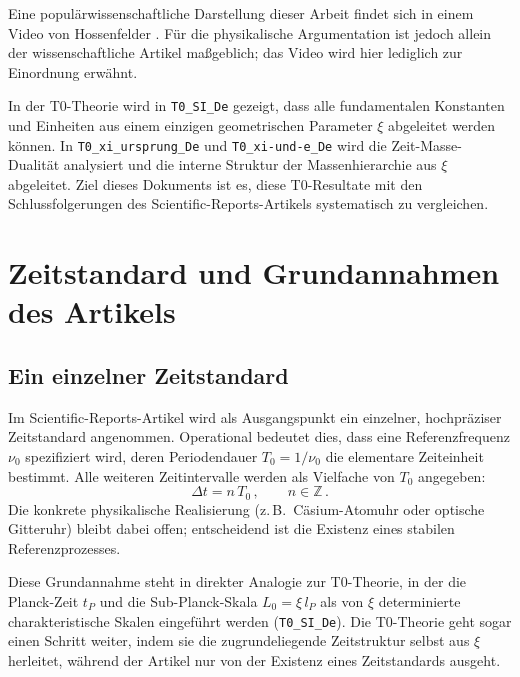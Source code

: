 Eine populärwissenschaftliche Darstellung dieser Arbeit findet sich in einem
Video von Hossenfelder \cite{hossenfelder_single_clock_video}. Für die
physikalische Argumentation ist jedoch allein der wissenschaftliche Artikel
maßgeblich; das Video wird hier lediglich zur Einordnung erwähnt.

In der T0-Theorie wird in \texttt{T0\_SI\_De} \cite{pascher_T0_SI_2024} gezeigt,
dass alle fundamentalen Konstanten und Einheiten aus einem einzigen
geometrischen Parameter $\xi$ abgeleitet werden können. In
\texttt{T0\_xi\_ursprung\_De} \cite{pascher_xi_ursprung_2025} und
\texttt{T0\_xi-und-e\_De} \cite{pascher_xi_und_e_2025} wird die
Zeit-Masse-Dualität analysiert und die interne Struktur der Massenhierarchie
aus $\xi$ abgeleitet. Ziel dieses Dokuments ist es, diese T0-Resultate mit den
Schlussfolgerungen des Scientific-Reports-Artikels systematisch zu vergleichen.

\section{Zeitstandard und Grundannahmen des Artikels}

\subsection{Ein einzelner Zeitstandard}

Im Scientific-Reports-Artikel wird als Ausgangspunkt ein einzelner,
hochpräziser Zeitstandard angenommen. Operational bedeutet dies, dass eine
Referenzfrequenz $\nu_0$ spezifiziert wird, deren Periodendauer $T_0 = 1/\nu_0$
die elementare Zeiteinheit bestimmt. Alle weiteren Zeitintervalle werden als
Vielfache von $T_0$ angegeben:
\begin{equation}
  \Delta t = n \, T_0 \, , \qquad n \in \mathbb{Z} \, .
\end{equation}
Die konkrete physikalische Realisierung (z.\,B.\ Cäsium-Atomuhr oder
optische Gitteruhr) bleibt dabei offen; entscheidend ist die Existenz eines
stabilen Referenzprozesses.

Diese Grundannahme steht in direkter Analogie zur T0-Theorie, in der die
Planck-Zeit $t_P$ und die Sub-Planck-Skala $L_0 = \xi\,l_P$ als von $\xi$
determinierte charakteristische Skalen eingeführt werden
(\texttt{T0\_SI\_De}). Die T0-Theorie geht sogar einen Schritt weiter, indem
sie die zugrundeliegende Zeitstruktur selbst aus $\xi$ herleitet, während der
Artikel nur von der Existenz eines Zeitstandards ausgeht.

